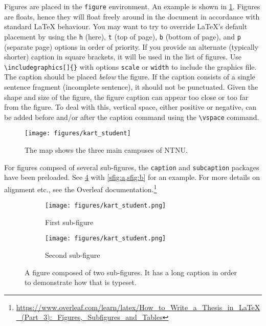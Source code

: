 {{Figures are placed in the \texttt{figure} environment. An example is shown in \cref{fig:mapNTNU}. Figures are floats, hence they will float freely around in the document in accordance with standard \LaTeX{} behaviour. You may want to try to override \LaTeX{}'s default placement by using the \texttt{h} (here), \texttt{t} (top of page), \texttt{b} (bottom of page), and \texttt{p} (separate page) options in order of priority. If you provide an alternate (typically shorter) caption in square brackets, it will be used in the list of figures. Use \texttt{\textbackslash includegraphics[]\{\}} with options \texttt{scale} or \texttt{width} to include the graphics file. The caption should be placed \emph{below} the figure. If the caption consists of a single sentence fragment (incomplete sentence), it should not be punctuated. Given the shape and size of the figure, the figure caption can appear too close or too far from the figure. To deal with this, vertical space, either positive or negative, can be added before and/or after the caption command using the \texttt{\textbackslash vspace{}} command.

\begin{figure}[htbp]  %
  \centering
  \texttt{[image: figures/kart\_student]}
  \caption[Map of NTNU Campuses]{The map shows the three main campuses of NTNU.}
  \label{fig:mapNTNU}
\end{figure}

For figures compsed of several sub-figures, the \texttt{caption} and \texttt{subcaption} packages have been preloaded. See \cref{fig:subfig} with \cref{sfig:a,sfig:b} for an example. For more details on alignment etc., see the Overleaf documentation.\footnote{\url{https://www.overleaf.com/learn/latex/How_to_Write_a_Thesis_in_LaTeX_(Part_3):_Figures,_Subfigures_and_Tables}}

\begin{figure}
    \centering
    \begin{subfigure}[b]{.45\textwidth}
        \centering
        \texttt{[image: figures/kart\_student.png]}
        \caption{First sub-figure}
        \label{sfig:a}
    \end{subfigure}
    \hfill
    \begin{subfigure}[b]{.45\textwidth}
        \centering
        \texttt{[image: figures/kart\_student.png]}
        \caption{Second sub-figure}
        \label{sfig:b}
    \end{subfigure}
    \caption{A figure composed of two sub-figures. It has a long caption in order to demonstrate how that is typeset.}
    \label{fig:subfig}
\end{figure}

}}
